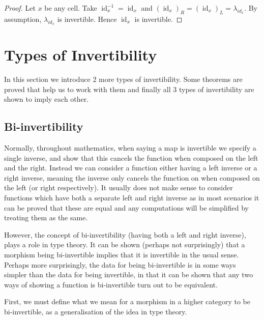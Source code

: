 \documentclass{article}
\theoremstyle{definition}
\theoremstyle{examplestyle}
\DeclareMathOperator{\id}{id}
\newcommand{\inv}[1]{#1^{-1}}
\begin{document}
\begin{proof}
  Let \(x\) be any cell. Take \(\inv {\id_x} = \id_x\) and \({(\id_x)}_R = {(\id_x)}_L = \lambda_{id_x}\). By assumption, \(\lambda_{id_x}\) is invertible. Hence \(\id_x\) is invertible.
\end{proof}

\section{Types of Invertibility}\label{sec:invertibility}

In this section we introduce 2 more types of invertibility. Some theorems are proved that help us to work with them and finally all 3 types of invertibility are shown to imply each other.

\subsection{Bi-invertibility}\label{sec:bi-invertibility}

Normally, throughout mathematics, when saying a map is invertible we specify a single inverse, and show that this cancels the function when composed on the left and the right. Instead we can consider a function either having a left inverse or a right inverse, meaning the inverse only cancels the function on when composed on the left (or right respectively). It usually does not make sense to consider functions which have both a separate left and right inverse as in most scenarios it can be proved that these are equal and any computations will be simplified by treating them as the same.

However, the concept of bi-invertibility (having both a left and right inverse), plays a role in type theory. It can be shown (perhaps not surprisingly) that a morphism being bi-invertible implies that it is invertible in the usual sense. Perhaps more surprisingly, the data for being bi-invertible is in some ways simpler than the data for being invertible, in that it can be shown that any two ways of showing a function is bi-invertible turn out to be equivalent.

First, we must define what we mean for a morphism in a higher category to be bi-invertible, as a generalisation of the idea in type theory.
\end{document}
